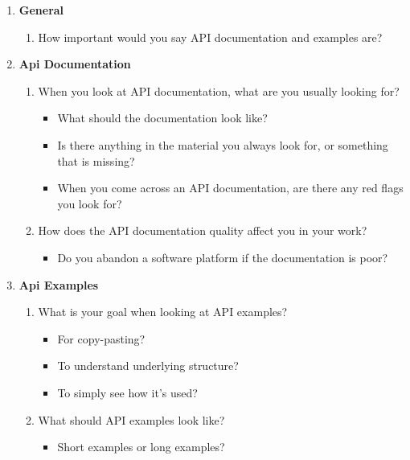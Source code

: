 \documentclass{cslthse-msc}
\begin{document}
    \begin{enumerate}[label={A\Alph*}]
        \item \textbf{General}
        \begin{enumerate}[label={AA\arabic*}]
            \item How important would you say API documentation and examples are?
        \end{enumerate}
        \item \textbf{Api Documentation}
        \begin{enumerate}[label=AB\arabic*]
            \item When you look at API documentation, what are you usually looking for?
            \begin{itemize}[label={-}]
                \item What should the documentation look like?
                \item Is there anything in the material you always look for, or something that is missing?
                \item When you come across an API documentation, are there any red flags you look for?
            \end{itemize}
            \item	How does the API documentation quality affect you in your work?
            \begin{itemize}[label={-}]
                \item Do you abandon a software platform if the documentation is poor?
            \end{itemize}
        \end{enumerate}
        \item \textbf{Api Examples}
        \begin{enumerate}[label={AC\arabic*}]
            \item	What is your goal when looking at API examples?
            \begin{itemize}[label={-}]
                \item For copy-pasting?
                \item To understand underlying structure?
                \item To simply see how it's used?
            \end{itemize}
            \item   What should API examples look like?
            \begin{itemize}[label={-}]
                \item Short examples or long examples?

\end{itemize}
\end{enumerate}
\end{enumerate}
\end{document}
